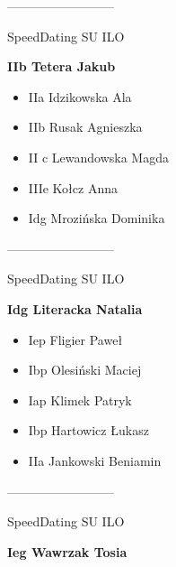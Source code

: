 \documentclass[a4paper,10pt]{article}
\begin{document}
\begin{multicols}{3}
\begin{minipage}[l]{\textwidth}
\begin{itemize}
    \end{itemize}



\end{minipage}



\begin{minipage}[l]{\textwidth}
--------------------------

  \footnotesize{SpeedDating SU ILO}

  \bfseries{IIb Tetera Jakub}

  \begin{itemize}
    \item IIa Idzikowska Ala
    \item IIb Rusak Agnieszka
    \item II c Lewandowska Magda
    \item IIIe Kołcz Anna
    \item Idg Mrozińska Dominika

    \end{itemize}



\end{minipage}



\begin{minipage}[l]{\textwidth}
--------------------------

  \footnotesize{SpeedDating SU ILO}

  \bfseries{Idg Literacka Natalia}

  \begin{itemize}
    \item Iep Fligier Paweł
    \item Ibp Olesiński Maciej
    \item Iap Klimek Patryk
    \item Ibp Hartowicz Łukasz
    \item IIa Jankowski Beniamin

    \end{itemize}



\end{minipage}



\begin{minipage}[l]{\textwidth}
--------------------------

  \footnotesize{SpeedDating SU ILO}

  \bfseries{Ieg Wawrzak Tosia}


\end{minipage}
\end{multicols}
\end{document}
